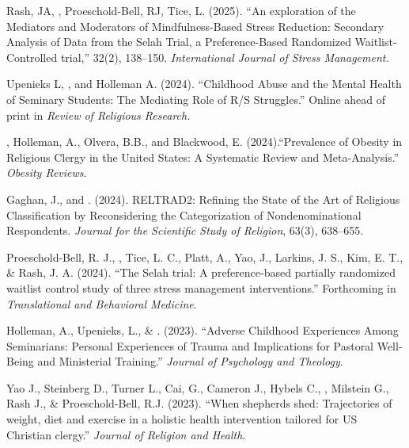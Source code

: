 \begin{etaremune}
\item Rash, JA, \Eagle, Proeschold-Bell, RJ, Tice, L. (2025). ``An exploration of the Mediators and Moderators of Mindfulness-Based Stress Reduction: Secondary Analysis of Data from the Selah Trial, a Preference-Based Randomized Waitlist-Controlled trial,'' 32(2), 138--150.  \textit{International Journal of Stress Management.} 

\item Upenieks L, \Eagle, and Holleman A.  (2024). ``Childhood Abuse and the Mental Health of Seminary Students: The Mediating Role of R/S Struggles.'' Online ahead of print in  \textit{Review of Religious Research.} 

\item \Eagle, Holleman, A., Olvera, B.B., and Blackwood, E. (2024).``Prevalence of Obesity in Religious Clergy in the United States: A Systematic Review and Meta-Analysis.'' \textit{Obesity Reviews}. 

\item Gaghan, J., and \Eagle. (2024). RELTRAD2: Refining the State of the Art of Religious Classification by Reconsidering the Categorization of Nondenominational Respondents. \textit{Journal for the Scientific Study of Religion}, 63(3), 638--655. 

\item Proeschold-Bell, R. J., \Eagle, Tice, L. C., Platt, A., Yao, J., Larkins, J. S., Kim, E. T., \& Rash, J. A. (2024). ``The Selah trial: A preference-based partially randomized waitlist control study of three stress management interventions.''  Forthcoming in \textit{Translational and Behavioral Medicine}. 

\item Holleman, A., Upenieks, L., \& \Eagle. (2023). ``Adverse Childhood Experiences Among Seminarians: Personal Experiences of Trauma and Implications for Pastoral Well-Being and Ministerial Training.'' \textit{Journal of Psychology and Theology}. 

\item Yao J., Steinberg D., Turner L., Cai, G., Cameron J., Hybels C., \Eagle, Milstein G., Rash J., \& Proeschold-Bell, R.J. (2023). ``When shepherds shed: Trajectories of weight, diet and exercise in a holistic health intervention tailored for US Christian clergy.'' \textit{Journal of Religion and Health}. 


\end{etaremune}
